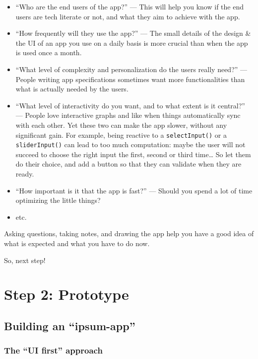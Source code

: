 \documentclass[]{book}
\providecommand{\tightlist}{%
  \setlength{\itemsep}{0pt}\setlength{\parskip}{0pt}}
\begin{document}
\begin{itemize}
\tightlist
\item
  ``Who are the end users of the app?'' --- This will help you know if the end users are tech literate or not, and what they aim to achieve with the app.
\item
  ``How frequently will they use the app?'' --- The small details of the design \& the UI of an app you use on a daily basis is more crucial than when the app is used once a month.
\item
  ``What level of complexity and personalization do the users really need?'' --- People writing app specifications sometimes want more functionalities than what is actually needed by the users.
\item
  ``What level of interactivity do you want, and to what extent is it central?'' --- People love interactive graphs and like when things automatically sync with each other. Yet these two can make the app slower, without any significant gain. For example, being reactive to a \texttt{selectInput()} or a \texttt{sliderInput()} can lead to too much computation: maybe the user will not succeed to choose the right input the first, second or third time\ldots{} So let them do their choice, and add a button so that they can validate when they are ready.
\item
  ``How important is it that the app is fast?'' --- Should you spend a lot of time optimizing the little things?
\item
  etc.
\end{itemize}

Asking questions, taking notes, and drawing the app help you have a good idea of what is expected and what you have to do now.

So, next step!

\hypertarget{part-step-2-prototype}{%
\part{Step 2: Prototype}\label{part-step-2-prototype}}

\hypertarget{stepprotopype}{%
\chapter{Building an ``ipsum-app''}\label{stepprotopype}}

\hypertarget{the-ui-first-approach}{%
\section{The ``UI first'' approach}\label{the-ui-first-approach}}
\end{document}
